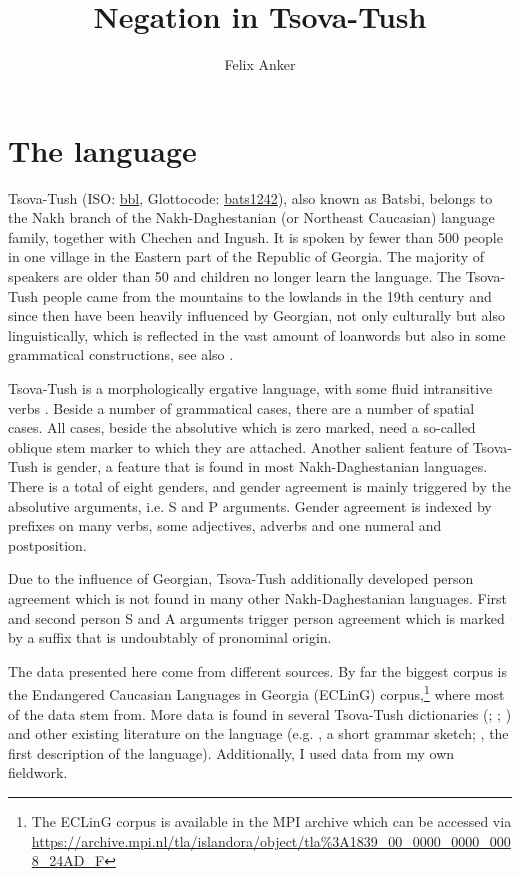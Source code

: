 \documentclass[output=paper,%
colorlinks,citecolor=brown,
showindex
]{langscibook}
\author{Felix Anker\affiliation{University of Jena}}
\title{Negation in Tsova-Tush}
\begin{document}
\maketitle

\section{The language}
\label{tsova:introduction}
Tsova-Tush (ISO: \href{https://iso639-3.sil.org/code/bbl}{bbl}, Glottocode: \href{https://glottolog.org/resource/languoid/id/bats1242}{bats1242}), also known as Batsbi, belongs to the Nakh branch of the Nakh-Daghestanian (or Northeast Caucasian) language family, together with Chechen and Ingush. It is spoken by fewer than 500 people in one village in the Eastern part of the Republic of Georgia. The majority of speakers are older than 50 and children no longer learn the language. The Tsova-Tush people came from the mountains to the lowlands in the 19th century and since then have been heavily influenced by Georgian, not only culturally but also linguistically, which is reflected in the vast amount of loanwords but also in some grammatical constructions, see also \citet{WichersSchreur2025}. 

Tsova-Tush is a morphologically ergative language,  with some fluid intransitive verbs \citep{Holisky1987}. Beside a number of grammatical cases, there are a number of spatial cases. All cases, beside the absolutive which is zero marked, need a so-called oblique stem marker to which they are attached. Another salient feature of Tsova-Tush is gender, a feature that is found in most Nakh-Daghestanian languages. There is  a total of eight genders, and gender agreement is mainly triggered by the absolutive arguments, i.e. S and P arguments. Gender agreement is indexed by prefixes on many verbs, some adjectives, adverbs and one numeral and postposition.


Due to the influence of Georgian, Tsova-Tush additionally developed person agreement which is not found in many other Nakh-Daghestanian languages. First and second person S and A arguments trigger person agreement which is marked by a suffix that is undoubtably of pronominal origin. 

The data presented here come from different sources. By far the biggest corpus is the Endangered Caucasian Languages in Georgia  (ECLinG) corpus,\footnote{The ECLinG corpus is available in the MPI archive which can be accessed via \url{https://archive.mpi.nl/tla/islandora/object/tla\%3A1839_00_0000_0000_0008_24AD_F}} where most of the data stem from. More data is found in several Tsova-Tush  dictionaries (\citealt{Kadagidze1984}; \citealt{BertlaniEtAl2013}; \citealt{BertlaniEtAl2019}) and other existing literature on the language (e.g. \citealt{HoliskyGagua1994}, a short grammar sketch; \citealt{Schiefner1856}, the first description of the language). Additionally, I used data from my own fieldwork.
\end{document}
